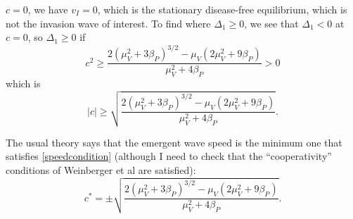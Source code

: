 \documentclass{jpmarticle}
\begin{document}
$c = 0$, we have $v_I = 0$, which is the stationary disease-free
equilibrium, which is not the invasion wave of interest.  To find
where $\Delta_1 \geq 0$, we see that $\Delta_1 < 0$ at $c = 0$, so
$\Delta_1 \geq 0$ if
\begin{equation}
  c^2 \geq 
  \frac{2 \left(\mu_V^2 + 3 \beta_P\right)^{3/2}
    - \mu_V \left(2 \mu_V^2 + 9 \beta_P\right)}
  {\mu_V^2 + 4 \beta_P}
  > 0
\end{equation}
which is
\begin{equation}
  \label{speedcondition}
  |c| \geq 
  \sqrt{\frac{2 \left(\mu_V^2 + 3 \beta_P\right)^{3/2}
      - \mu_V \left(2 \mu_V^2 + 9 \beta_P\right)}
    {\mu_V^2 + 4 \beta_P}}.
\end{equation}

The usual theory says that the emergent wave speed is the minimum one
that satisfies \eqref{speedcondition} (although I need to check that the
``cooperativity'' conditions of Weinberger et al are satisfied):
\begin{equation}
  c^* = \pm \sqrt{\frac{2 \left(\mu_V^2 + 3 \beta_P\right)^{3/2}
      - \mu_V \left(2 \mu_V^2 + 9 \beta_P\right)}
    {\mu_V^2 + 4 \beta_P}}.
\end{equation}


\end{document}

